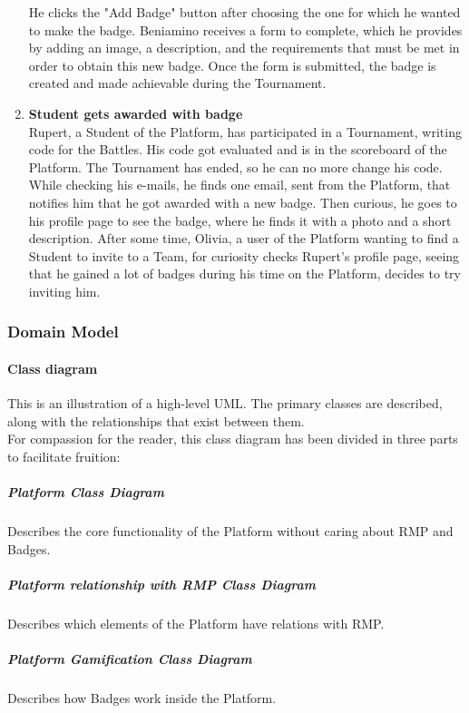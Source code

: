 \begin{enumerate}[label= \textbf{SC\arabic*}]
    He clicks the "Add Badge" button after choosing the one for which he wanted to make the badge. Beniamino receives a form to complete, which he provides by adding an image, a description, and the requirements that must be met in order 
    to obtain this new badge. Once the form is submitted, the badge is created and made achievable during the Tournament.
    \item \textbf{Student gets awarded with badge} \label{sc:sc13} \\
    Rupert, a Student of the Platform, has participated in a Tournament, writing code for the Battles. His code got evaluated and is in the scoreboard of the Platform. The Tournament has ended, so he can no more change his code. 
    While checking his e-mails, he finds one email, sent from the Platform, that notifies him that he got awarded with a new badge.
    Then curious, he goes to his profile page to see the badge, where he finds it with a photo and a short description.
    After some time, Olivia, a user of the Platform wanting to find a Student to invite to a Team, for curiosity checks Rupert's profile page, seeing that he gained a lot of badges during his time on the Platform, decides to try inviting him.
\end{enumerate}

\newpage

\subsubsection{Domain Model}

\paragraph{Class diagram}
This is an illustration of a high-level UML. The primary classes are described, along with the relationships that exist between them.
\\For compassion for the reader, this class diagram has been divided in three parts to facilitate fruition:
\newpage
\subparagraph{Platform Class Diagram}
Describes the core functionality of the Platform without caring about RMP and Badges.\\
\newpage
\subparagraph{Platform relationship with RMP Class Diagram}
Describes which elements of the Platform have relations with RMP.\\
\subparagraph{Platform Gamification Class Diagram}
Describes how Badges work inside the Platform.\\
\newpage 

